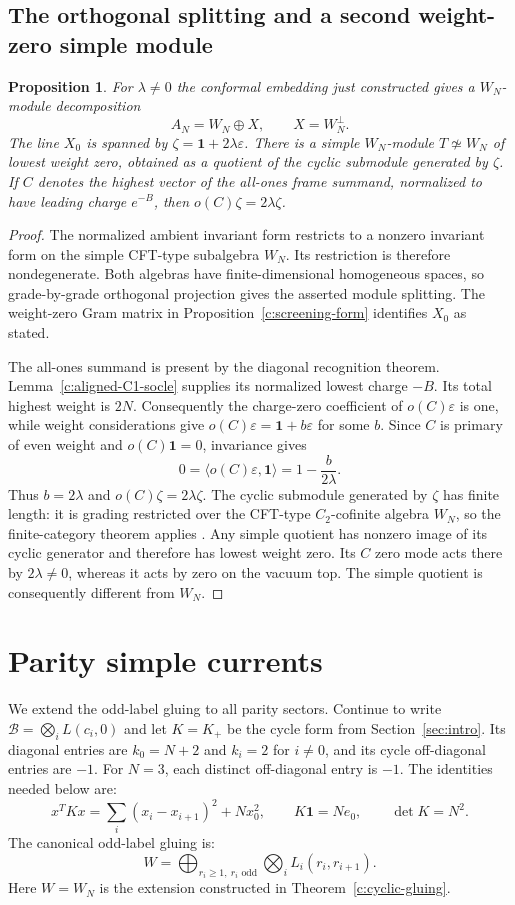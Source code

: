 \documentclass[11pt,a4paper]{article}
\numberwithin{equation}{section}
\newtheorem{proposition}[theorem]{Proposition}
\theoremstyle{definition}\newtheorem{definition}[theorem]{Definition}
\theoremstyle{remark}\newtheorem{remark}[theorem]{Remark}
\newcommand{\one}{\mathbf1}\newcommand{\B}{\mathcal B}\newcommand{\W}{W_N}
\begin{document}
\subsection{The orthogonal splitting and a second weight-zero simple module}
\begin{proposition}\label{c:ambient-splitting}
For $\lambda\ne0$ the conformal embedding just constructed gives
a $W_N$-module decomposition
\[
 A_N=W_N\oplus X,\qquad X=W_N^\perp.
\]
The line $X_0$ is spanned by $\zeta=\one+2\lambda\varepsilon$.
There is a simple $W_N$-module $T\not\simeq W_N$ of lowest weight
zero, obtained as a quotient of the cyclic submodule generated by
$\zeta$.  If $C$ denotes the highest vector of the all-ones frame
summand, normalized to have leading charge $e^{-B}$, then
$o(C)\zeta=2\lambda\zeta$.
\end{proposition}
\begin{proof}
The normalized ambient invariant form restricts to a nonzero invariant
form on the simple CFT-type subalgebra $W_N$.  Its restriction is
therefore nondegenerate.  Both algebras have finite-dimensional
homogeneous spaces, so grade-by-grade orthogonal projection gives
the asserted module splitting.  The weight-zero Gram matrix in
Proposition~\ref{c:screening-form} identifies $X_0$ as stated.

The all-ones summand is present by the diagonal recognition theorem.
Lemma~\ref{c:aligned-C1-socle} supplies its normalized lowest charge
$-B$.  Its total highest weight is $2N$.
Consequently the charge-zero coefficient of $o(C)\varepsilon$ is
one, while weight considerations give
$o(C)\varepsilon=\one+b\varepsilon$ for some $b$.
Since $C$ is primary of even weight and $o(C)\one=0$, invariance gives
\[
 0=\langle o(C)\varepsilon,\one\rangle
   =1-\frac{b}{2\lambda}.
\]
Thus $b=2\lambda$ and $o(C)\zeta=2\lambda\zeta$.
The cyclic submodule generated by $\zeta$ has finite length: it is
grading restricted over the CFT-type $C_2$-cofinite algebra $W_N$,
so the finite-category theorem applies \cite{huang}.
Any simple quotient has nonzero image of its cyclic generator and
therefore has lowest weight zero.  Its $C$ zero mode acts there by
$2\lambda\ne0$, whereas it acts by zero on the vacuum top.  The
simple quotient is consequently different from $W_N$.
\end{proof}


\section{Parity simple currents}
\label{sec:parity-currents}
We extend the odd-label gluing to all parity sectors. Continue to write
$\mathcal B=\bigotimes_iL(c_i,0)$ and let $K=K_+$ be the cycle form
from Section~\ref{sec:intro}. Its diagonal entries are
$k_0=N+2$ and $k_i=2$ for $i\ne0$, and its cycle off-diagonal
entries are $-1$. For $N=3$, each distinct off-diagonal entry is
$-1$. The identities needed below are:
\[
 x^TKx=\sum_i(x_i-x_{i+1})^2+Nx_0^2,
 \qquad K\mathbf1=Ne_0,\qquad \det K=N^2.
\]
The canonical odd-label gluing is:
\[
 W=\bigoplus_{r_i\geq1,\ r_i\text{ odd}}
       \bigotimes_iL_i(r_i,r_{i+1}).
\]
Here $W=W_N$ is the extension constructed in
Theorem~\ref{c:cyclic-gluing}.
\end{document}
